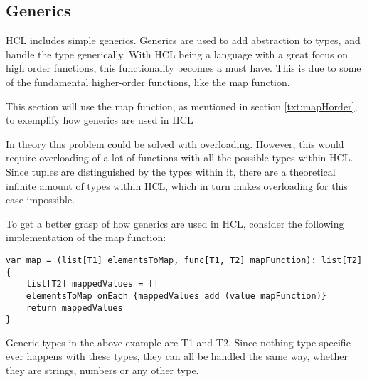 \subsection{Generics}
HCL includes simple generics.
Generics are used to add abstraction to types, and handle the type generically.
With HCL being a language with a great focus on high order functions, this functionality becomes a must have.
This is due to some of the fundamental higher-order functions, like the map function.

This section will use the map function, as mentioned in section \ref{txt:mapHorder}, to exemplify how generics are used in HCL

In theory this problem could be solved with overloading. 
However, this would require overloading of a lot of functions with all the possible types within HCL. 
Since tuples are distinguished by the types within it, there are a theoretical infinite amount of types within HCL, which in turn makes overloading for this case impossible.

To get a better grasp of how generics are used in HCL, consider the following implementation of the map function:
\begin{lstlisting}[language=HCL,label=lis:hclMapping,firstnumber=1]
var map = (list[T1] elementsToMap, func[T1, T2] mapFunction): list[T2] {
	list[T2] mappedValues = []
	elementsToMap onEach {mappedValues add (value mapFunction)}
	return mappedValues
}
\end{lstlisting}

Generic types in the above example are T1 and T2. 
Since nothing type specific ever happens with these types, they can all be handled the same way, whether they are strings, numbers or any other type.
